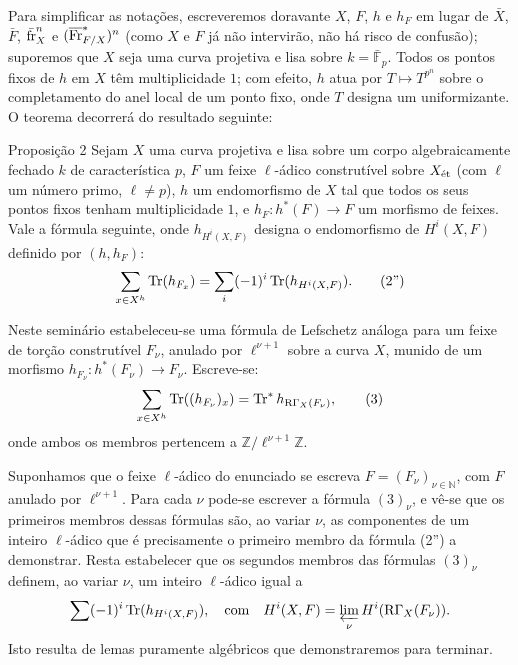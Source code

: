 Para simplificar as notações, escreveremos doravante $X$, $F$, $h$ e $h_F$ em lugar de $\bar X$, $\bar F$, $\bar{\operatorname{fr}}_X^n$ e $(\overline{\operatorname{Fr}}^*_{F/X})^n$ (como $X$ e $F$ já não intervirão, não há risco de confusão); suporemos que $X$ seja uma curva projetiva e lisa sobre $k=\bar{\mathbb F}_p$. Todos os pontos fixos de $h$ em $X$ têm multiplicidade $1$; com efeito, $h$ atua por $T\mapsto T^{p^n}$ sobre o completamento do anel local de um ponto fixo, onde $T$ designa um uniformizante. O teorema decorrerá do resultado seguinte:

\begin{statement}{Proposição 2}
Sejam $X$ uma curva projetiva e lisa sobre um corpo algebraicamente fechado $k$ de característica $p$, $F$ um feixe $\ell$-ádico construtível sobre $X_{\mathrm{\acute{e}t}}$ (com $\ell$ um número primo, $\ell\ne p$), $h$ um endomorfismo de $X$ tal que todos os seus pontos fixos tenham multiplicidade $1$, e $h_F:h^*(F)\to F$ um morfismo de feixes. Vale a fórmula seguinte, onde $h_{H^i(X,F)}$ designa o endomorfismo de $H^i(X,F)$ definido por $(h,h_F)$:
\[
\sum_{x\in X^h}\operatorname{Tr}(h_{F_x})=\sum_i(-1)^i\operatorname{Tr}(h_{H^i(X,F)}).
\tag{2''}
\]
\end{statement}

Neste seminário estabeleceu-se uma fórmula de Lefschetz análoga para um feixe de torção construtível $F_\nu$, anulado por $\ell^{\nu+1}$ sobre a curva $X$, munido de um morfismo $h_{F_\nu}:h^*(F_\nu)\to F_\nu$. Escreve-se:
\[
\sum_{x\in X^h}\operatorname{Tr}((h_{F_\nu})_x)=\operatorname{Tr}^*h_{\mathrm{R}\Gamma_X(F_\nu)},
\tag{3}
\]
onde ambos os membros pertencem a $\mathbb Z/\ell^{\nu+1}\mathbb Z$.

Suponhamos que o feixe $\ell$-ádico do enunciado se escreva $F=(F_\nu)_{\nu\in\mathbb N}$, com $F$ anulado por $\ell^{\nu+1}$. Para cada $\nu$ pode-se escrever a fórmula $(3)_\nu$, e vê-se que os primeiros membros dessas fórmulas são, ao variar $\nu$, as componentes de um inteiro $\ell$-ádico que é precisamente o primeiro membro da fórmula (2'') a demonstrar. Resta estabelecer que os segundos membros das fórmulas $(3)_\nu$ definem, ao variar $\nu$, um inteiro $\ell$-ádico igual a
\[
\sum(-1)^i\operatorname{Tr}(h_{H^i(X,F)}),
\quad\text{com}\quad
H^i(X,F)=\varprojlim_\nu H^i(\mathrm{R}\Gamma_X(F_\nu)).
\]
Isto resulta de lemas puramente algébricos que demonstraremos para terminar.
